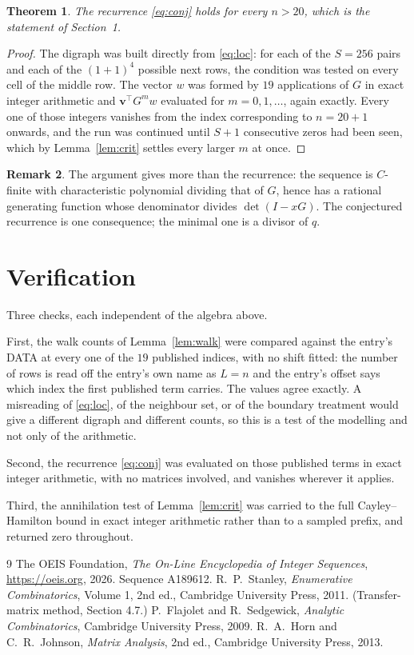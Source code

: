 \documentclass[11pt,a4paper]{article}
\theoremstyle{plain}
\newtheorem{theorem}{Theorem}
\theoremstyle{definition}
\newtheorem{remark}[theorem]{Remark}
\begin{document}
\begin{theorem}
The recurrence \eqref{eq:conj} holds for every $n>20$, which is the statement of
Section~1.
\end{theorem}

\begin{proof}
The digraph was built directly from \eqref{eq:loc}: for each of the $S=256$ pairs and each
of the $(1+1)^{4}$ possible next rows, the condition was tested on every cell of
the middle row. The vector $w$ was formed by $19$ applications of $G$ in exact integer
arithmetic and $\mathbf{v}^{\!\top}G^{m}w$ evaluated for $m=0,1,\dots$, again exactly.
Every one of those integers vanishes from the index corresponding to $n=20+1$ onwards,
and the run was continued until $S+1$ consecutive zeros had been seen, which by
Lemma~\ref{lem:crit} settles every larger $m$ at once.
\end{proof}

\begin{remark}
The argument gives more than the recurrence: the sequence is $C$-finite with characteristic
polynomial dividing that of $G$, hence has a rational generating function whose denominator
divides $\det(I-xG)$. The conjectured recurrence is one consequence; the minimal one is a
divisor of $q$.
\end{remark}

\section{Verification}

Three checks, each independent of the algebra above.

First, the walk counts of Lemma~\ref{lem:walk} were compared against the entry's DATA at
every one of the $19$ published indices, with no shift fitted: the number of rows is
read off the entry's own name as $L=n$ and the entry's offset says which index the first
published term carries. The values agree exactly. A misreading of \eqref{eq:loc}, of the
neighbour set, or of the boundary treatment would give a different digraph and different
counts, so this is a test of the modelling and not only of the arithmetic.

Second, the recurrence \eqref{eq:conj} was evaluated on those published terms in exact
integer arithmetic, with no matrices involved, and vanishes wherever it applies.

Third, the annihilation test of Lemma~\ref{lem:crit} was carried to the full
Cayley--Hamilton bound in exact integer arithmetic rather than to a sampled prefix, and
returned zero throughout.

\begin{thebibliography}{9}
 The OEIS Foundation, \emph{The On-Line Encyclopedia of Integer
Sequences}, \url{https://oeis.org}, 2026. Sequence A189612.
 R.~P.~Stanley, \emph{Enumerative Combinatorics}, Volume 1, 2nd ed.,
Cambridge University Press, 2011. (Transfer-matrix method, Section 4.7.)
 P.~Flajolet and R.~Sedgewick, \emph{Analytic Combinatorics}, Cambridge
University Press, 2009.
 R.~A.~Horn and C.~R.~Johnson, \emph{Matrix Analysis}, 2nd ed., Cambridge
University Press, 2013.
\end{thebibliography}
\end{document}
